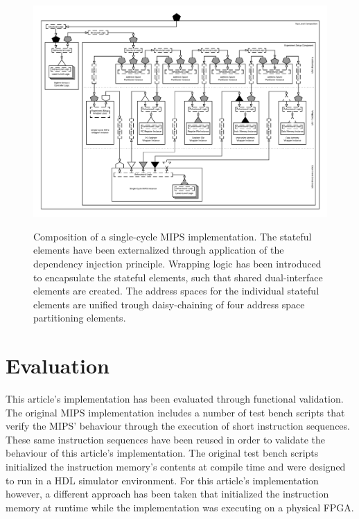 \documentclass{article}
\begin{document}
\begin{landscape}

\begin{figure}[h!]
    \centering
    \caption{Composition of a single-cycle MIPS implementation. The stateful elements have been externalized through application of the dependency injection principle. Wrapping logic has been introduced to encapsulate the stateful elements, such that shared dual-interface elements are created. The address spaces for the individual stateful elements are unified trough daisy-chaining of four address space partitioning elements.}
    \includegraphics[height=0.95\textwidth,trim=70px 0px 70px 70px, clip=true]{img/mips-wrapped}
    \label{fig:mips-wrapped}
\end{figure}

\end{landscape}

\section{Evaluation}

This article's implementation has been evaluated through functional validation. The original MIPS implementation includes a number of test bench scripts that verify the MIPS' behaviour through the execution of short instruction sequences. These same instruction sequences have been reused in order to validate the behaviour of this article's implementation. The original test bench scripts initialized the instruction memory's contents at compile time and were designed to run in a HDL simulator environment. For this article's implementation however, a different approach has been taken that initialized the instruction memory at runtime while the implementation was executing on a physical FPGA.
\end{document}
